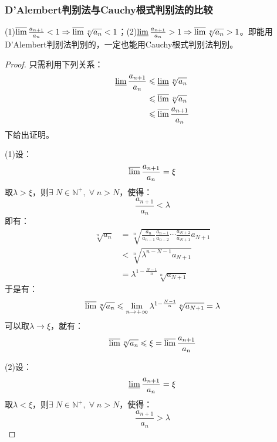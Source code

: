 \subsubsection{D'Alembert判别法与Cauchy根式判别法的比较}
\begin{theorem}
	(1)\;$\varlimsup\frac{a_{n+1}}{a_n}<1\Rightarrow\varlimsup\sqrt[n]{a_n}<1$；(2)\;$\varliminf\frac{a_{n+1}}{a_n}>1\Rightarrow\varlimsup\sqrt[n]{a_n}>1$。即能用D'Alembert判别法判别的，一定也能用Cauchy根式判别法判别。
\end{theorem}
\begin{proof}
	只需利用下列关系：
	\begin{align*}
		\varliminf\frac{a_{n+1}}{a_n}
		&\leqslant\varliminf\sqrt[n]{a_n} \\
		&\leqslant\varlimsup\sqrt[n]{a_n} \\
		&\leqslant\varlimsup\frac{a_{n+1}}{a_n}
	\end{align*}
	下给出证明。\par
	(1)设：
	\begin{equation*}
		\varlimsup\frac{a_{n+1}}{a_n}=\xi
	\end{equation*}
	取$\lambda>\xi$，则$\exists\;N\in\mathbb{N}^+,\;\forall\;n>N$，使得：
	\begin{equation*}
		\frac{a_{n+1}}{a_n}<\lambda
	\end{equation*}	
	即有：
	\begin{align*}
		\sqrt[n]{a_n}&=\sqrt[n]{\frac{a_n}{a_{n-1}}\frac{a_{n-1}}{a_{n-2}}\cdots\frac{a_{N+2}}{a_{N+1}}a_{N+1}} \\
		&<\sqrt[n]{\lambda^{n-N-1}a_{N+1}} \\
		&=\lambda^{1-\frac{N-1}{n}}\sqrt[n]{a_{N+1}}
	\end{align*}
	于是有：
	\begin{equation*}
		\varlimsup\sqrt[n]{a_n}\leqslant\lim_{n\to+\infty}\lambda^{1-\frac{N-1}{n}}\sqrt[n]{a_{N+1}}=\lambda
	\end{equation*}
	可以取$\lambda\rightarrow\xi$，就有：
	\begin{equation*}
		\varlimsup\sqrt[n]{a_n}\leqslant\xi=\varlimsup\frac{a_{n+1}}{a_n}
	\end{equation*}\par
	(2)设：
	\begin{equation*}
		\varliminf\frac{a_{n+1}}{a_n}=\xi
	\end{equation*}
	取$\lambda<\xi$，则$\exists\;N\in\mathbb{N}^+,\;\forall\;n>N$，使得：
	\begin{equation*}
		\frac{a_{n+1}}{a_n}>\lambda

\end{equation*}
\end{proof}

